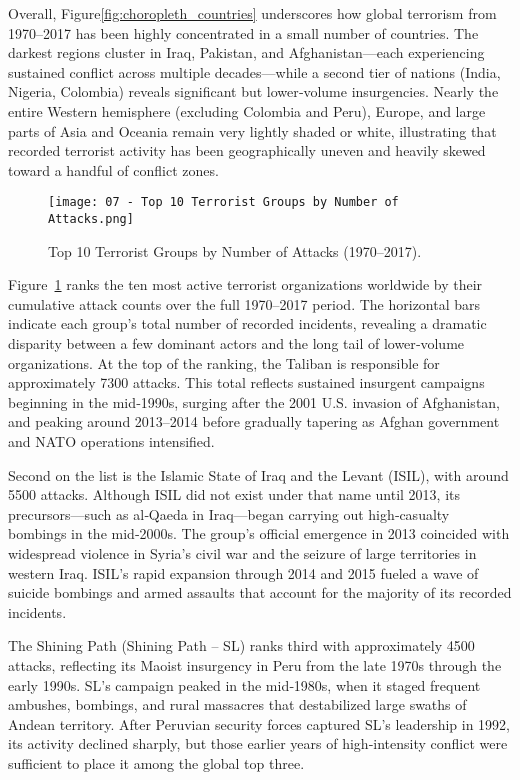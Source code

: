 Overall, Figure\ref{fig:choropleth_countries} underscores how global terrorism from 1970–2017 has been highly concentrated in a small number of countries. The darkest regions cluster in Iraq, Pakistan, and Afghanistan—each experiencing sustained conflict across multiple decades—while a second tier of nations (India, Nigeria, Colombia) reveals significant but lower‐volume insurgencies. Nearly the entire Western hemisphere (excluding Colombia and Peru), Europe, and large parts of Asia and Oceania remain very lightly shaded or white, illustrating that recorded terrorist activity has been geographically uneven and heavily skewed toward a handful of conflict zones.


\vspace{0.5em}
\begin{figure}[ht]
  \centering
  \texttt{[image: 07 - Top 10 Terrorist Groups by Number of Attacks.png]}
  \caption{Top 10 Terrorist Groups by Number of Attacks (1970–2017).}
  \label{fig:top10_groups}
\end{figure}

Figure~\ref{fig:top10_groups} ranks the ten most active terrorist organizations worldwide by their cumulative attack counts over the full 1970–2017 period. The horizontal bars indicate each group’s total number of recorded incidents, revealing a dramatic disparity between a few dominant actors and the long tail of lower‐volume organizations. At the top of the ranking, the Taliban is responsible for approximately 7300 attacks. This total reflects sustained insurgent campaigns beginning in the mid‐1990s, surging after the 2001 U.S. invasion of Afghanistan, and peaking around 2013–2014 before gradually tapering as Afghan government and NATO operations intensified.  

Second on the list is the Islamic State of Iraq and the Levant (ISIL), with around 5500 attacks. Although ISIL did not exist under that name until 2013, its precursors—such as al‐Qaeda in Iraq—began carrying out high‐casualty bombings in the mid‐2000s. The group’s official emergence in 2013 coincided with widespread violence in Syria’s civil war and the seizure of large territories in western Iraq. ISIL’s rapid expansion through 2014 and 2015 fueled a wave of suicide bombings and armed assaults that account for the majority of its recorded incidents.  

The Shining Path (Shining Path – SL) ranks third with approximately 4500 attacks, reflecting its Maoist insurgency in Peru from the late 1970s through the early 1990s. SL’s campaign peaked in the mid‐1980s, when it staged frequent ambushes, bombings, and rural massacres that destabilized large swaths of Andean territory. After Peruvian security forces captured SL’s leadership in 1992, its activity declined sharply, but those earlier years of high‐intensity conflict were sufficient to place it among the global top three.  

